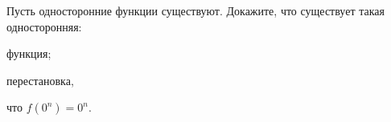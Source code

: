 Пусть односторонние функции существуют. Докажите, что существует такая односторонняя:
\begin{enumcyr}
    \item функция;
    \item перестановка,
\end{enumcyr}
что $f(0^n) = 0^n$.